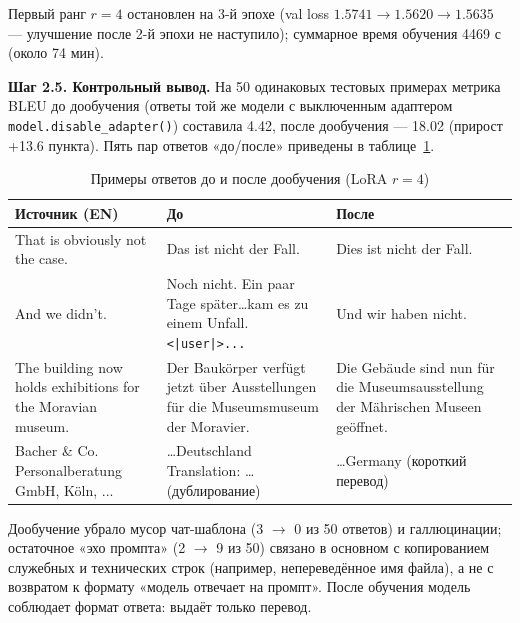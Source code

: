\documentclass[14pt,a4paper]{extarticle}
\begin{document}
Первый ранг $r=4$ остановлен на 3-й эпохе (val loss $1.5741 \to 1.5620 \to 1.5635$ ---
улучшение после 2-й эпохи не наступило); суммарное время обучения 4469 с (около 74 мин).

\textbf{Шаг 2.5. Контрольный вывод.} На 50 одинаковых тестовых примерах метрика BLEU
до дообучения (ответы той же модели с выключенным адаптером
\texttt{model.disable\_adapter()}) составила 4.42, после дообучения --- 18.02
(прирост +13.6 пункта). Пять пар ответов «до/после» приведены в таблице~\ref{tab:pairs}.

\begin{table}[H]
    \centering
    \caption*{\raggedleft Примеры ответов до и после дообучения (LoRA $r=4$)}
    \label{tab:pairs}
    \small
    \begin{tabular}{p{}p{}p{}}
        \toprule
        Источник (EN) & До & После \\
        \midrule
        That is obviously not the case. &
        Das ist nicht der Fall. &
        Dies ist nicht der Fall. \\
        \addlinespace
        And we didn't. &
        Noch nicht. \newline Ein paar Tage sp\"ater\ldots kam es zu einem Unfall. \newline \texttt{<|user|>...} &
        Und wir haben nicht. \\
        \addlinespace
        The building now holds exhibitions for the Moravian museum. &
        Der Bauk\"orper verf\"ugt jetzt \"uber Ausstellungen f\"ur die Museumsmuseum der Moravier. &
        Die Geb\"aude sind nun f\"ur die Museumsausstellung der M\"ahrischen Museen ge\"offnet. \\
        \addlinespace
        Bacher \& Co. Personalberatung GmbH, K\"oln, ... &
        \ldots Deutschland \newline Translation: \ldots (дублирование) &
        \ldots Germany (короткий перевод) \\
        \bottomrule
    \end{tabular}
\end{table}

Дообучение убрало мусор чат-шаблона (3 $\to$ 0 из 50 ответов) и галлюцинации; остаточное
«эхо промпта» (2 $\to$ 9 из 50) связано в основном с копированием служебных и
технических строк (например, непереведённое имя файла), а не с возвратом к формату
«модель отвечает на промпт». После обучения модель соблюдает формат ответа: выдаёт
только перевод.
\end{document}
